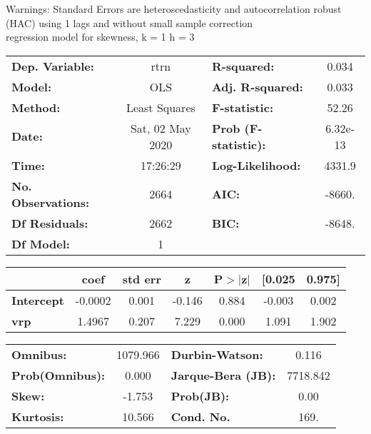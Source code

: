 Warnings: \newline
 [1] Standard Errors are heteroscedasticity and autocorrelation robust (HAC) using 1 lags and without small sample correction\\ 

regression model for skewness, k = 1 h = 3\begin{center}
\begin{tabular}{lclc}
\toprule
\textbf{Dep. Variable:}    &       rtrn       & \textbf{  R-squared:         } &     0.034   \\
\textbf{Model:}            &       OLS        & \textbf{  Adj. R-squared:    } &     0.033   \\
\textbf{Method:}           &  Least Squares   & \textbf{  F-statistic:       } &     52.26   \\
\textbf{Date:}             & Sat, 02 May 2020 & \textbf{  Prob (F-statistic):} &  6.32e-13   \\
\textbf{Time:}             &     17:26:29     & \textbf{  Log-Likelihood:    } &    4331.9   \\
\textbf{No. Observations:} &        2664      & \textbf{  AIC:               } &    -8660.   \\
\textbf{Df Residuals:}     &        2662      & \textbf{  BIC:               } &    -8648.   \\
\textbf{Df Model:}         &           1      & \textbf{                     } &             \\
\bottomrule
\end{tabular}
\begin{tabular}{lcccccc}
                   & \textbf{coef} & \textbf{std err} & \textbf{z} & \textbf{P$> |$z$|$} & \textbf{[0.025} & \textbf{0.975]}  \\
\midrule
\textbf{Intercept} &      -0.0002  &        0.001     &    -0.146  &         0.884        &       -0.003    &        0.002     \\
\textbf{vrp}       &       1.4967  &        0.207     &     7.229  &         0.000        &        1.091    &        1.902     \\
\bottomrule
\end{tabular}
\begin{tabular}{lclc}
\textbf{Omnibus:}       & 1079.966 & \textbf{  Durbin-Watson:     } &    0.116  \\
\textbf{Prob(Omnibus):} &   0.000  & \textbf{  Jarque-Bera (JB):  } & 7718.842  \\
\textbf{Skew:}          &  -1.753  & \textbf{  Prob(JB):          } &     0.00  \\
\textbf{Kurtosis:}      &  10.566  & \textbf{  Cond. No.          } &     169.  \\
\bottomrule
\end{tabular}
\end{center}

